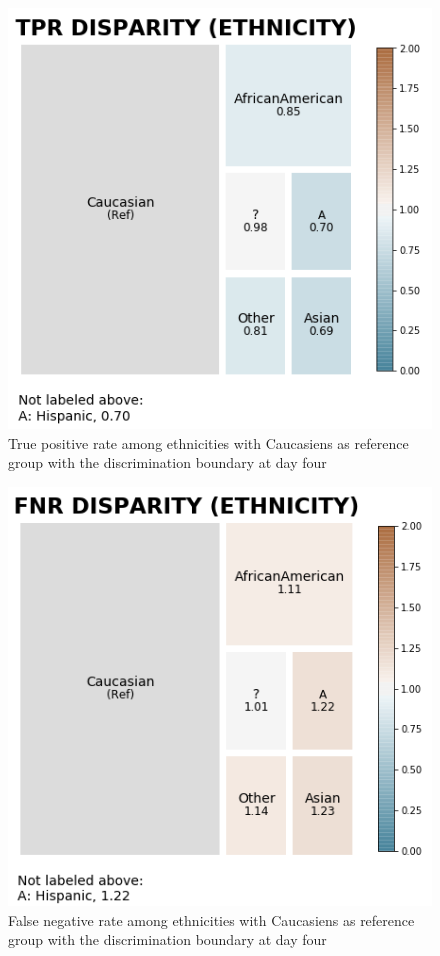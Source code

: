 \documentclass[journal]{IEEEtran}
\begin{document}
\begin{figure}
	\centering
	\includegraphics[width=0.8\linewidth]{../imgs/tpr_paper}
	\caption{True positive rate among ethnicities with Caucasiens as reference group with the discrimination boundary at day four}
	\label{fig:tpr}
\end{figure}

\begin{figure}
	\centering
	\includegraphics[width=0.8\linewidth]{../imgs/fnr_paper}
	\caption{False negative rate among ethnicities with Caucasiens as reference group with the discrimination boundary at day four}
	\label{fig:fpr}
\end{figure}
\end{document}
